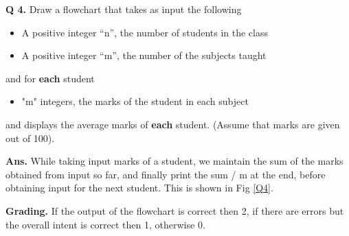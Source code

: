 \documentclass{article}
\begin{document}
    \clearpage


\begin{flushleft}
    \textbf{Q 4. } Draw a flowchart that takes as input the following
    \begin{itemize}
        \item A positive integer “n”, the number of students in the class
        \item A positive integer “m”, the number of the subjects
              taught
    \end{itemize}

    and for \textbf{each} student

    \begin{itemize}
        \item "m" integers, the marks of the student in each subject 
    \end{itemize}

    and displays the average marks of \textbf{each} student. (Assume that marks
    are given out of 100).
    
    \end{flushleft}
    
    \begin{flushleft}
    
    \textbf{Ans. } While taking input marks of a student, we maintain the sum 
    of the marks obtained from input so far, and finally print the sum / m at the 
    end, before obtaining input for the next student. This is shown in Fig \ref{Q4}.
    
    \end{flushleft}
    
    \begin{flushleft}
    
    \textbf{Grading. } If the output of the flowchart is correct then 2, if there are 
    errors but the overall intent is correct then 1, otherwise 0.
    
\end{flushleft}
    
\end{document}
